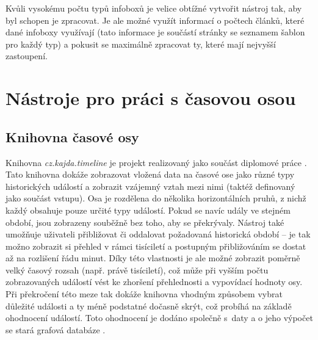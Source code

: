 Kvůli vysokému počtu typů infoboxů je velice obtížné vytvořit nástroj tak, aby byl schopen je zpracovat. Je ale možné využít informací o počtech článků, které dané infoboxy využívají (tato informace je součástí stránky se seznamem šablon pro každý typ) a pokusit se maximálně zpracovat ty, které mají nejvyšší zastoupení.

 
 
 
 
\chapter{Nástroje pro práci s časovou osou}
\section{Knihovna časové osy}
Knihovna \textit{cz.kajda.timeline} je projekt realizovaný jako součást diplomové práce \cite{timeline}. Tato knihovna dokáže zobrazovat vložená data na časové ose jako různé typy historických událostí a zobrazit vzájemný vztah mezi nimi (taktéž definovaný jako součást vstupu). Osa je rozdělena do několika horizontálních pruhů, z nichž každý obsahuje pouze určité typy událostí. Pokud se navíc udály ve stejném období, jsou zobrazeny souběžně bez toho, aby se překrývaly. Nástroj také umožňuje uživateli přibližovat či oddalovat požadovaná historická období -- je tak možno zobrazit si přehled v rámci tisíciletí a postupným přibližováním se dostat až na rozlišení řádu minut. Díky této vlastnosti je ale možné zobrazit poměrně velký časový rozsah (např. právě tisíciletí), což může při vyšším počtu zobrazovaných událostí vést ke zhoršení přehlednosti a vypovídací hodnoty osy. Při překročení této meze tak dokáže knihovna vhodným způsobem vybrat důležité události a ty méně podstatné dočasně skrýt, což probíhá na základě ohodnocení událostí. Toto ohodnocení je dodáno společně s~daty a o jeho výpočet se stará grafová databáze \cite{pagerank}.
